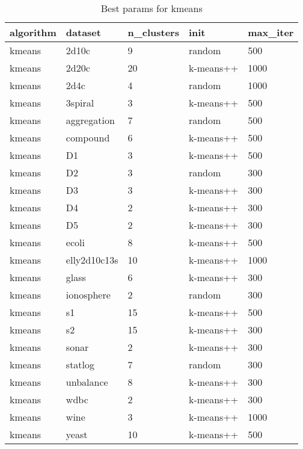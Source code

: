 \begin{table}[H]
\centering
\caption{Best params for kmeans}
\label{S30_Table}
\begin{tabular}{|l|l|l|l|l|}
\hline
algorithm & dataset & n\_clusters & init & max\_iter \\
\hline
kmeans & 2d10c & 9 & random & 500 \\
\hline
kmeans & 2d20c & 20 & k-means++ & 1000 \\
\hline
kmeans & 2d4c & 4 & random & 1000 \\
\hline
kmeans & 3spiral & 3 & k-means++ & 500 \\
\hline
kmeans & aggregation & 7 & random & 500 \\
\hline
kmeans & compound & 6 & k-means++ & 500 \\
\hline
kmeans & D1 & 3 & k-means++ & 500 \\
\hline
kmeans & D2 & 3 & random & 300 \\
\hline
kmeans & D3 & 3 & k-means++ & 300 \\
\hline
kmeans & D4 & 2 & k-means++ & 300 \\
\hline
kmeans & D5 & 2 & k-means++ & 300 \\
\hline
kmeans & ecoli & 8 & k-means++ & 500 \\
\hline
kmeans & elly2d10c13s & 10 & k-means++ & 1000 \\
\hline
kmeans & glass & 6 & k-means++ & 300 \\
\hline
kmeans & ionosphere & 2 & random & 300 \\
\hline
kmeans & s1 & 15 & k-means++ & 500 \\
\hline
kmeans & s2 & 15 & k-means++ & 300 \\
\hline
kmeans & sonar & 2 & k-means++ & 300 \\
\hline
kmeans & statlog & 7 & random & 300 \\
\hline
kmeans & unbalance & 8 & k-means++ & 300 \\
\hline
kmeans & wdbc & 2 & k-means++ & 300 \\
\hline
kmeans & wine & 3 & k-means++ & 1000 \\
\hline
kmeans & yeast & 10 & k-means++ & 500 \\
\hline
\end{tabular}
\end{table}

\clearpage

